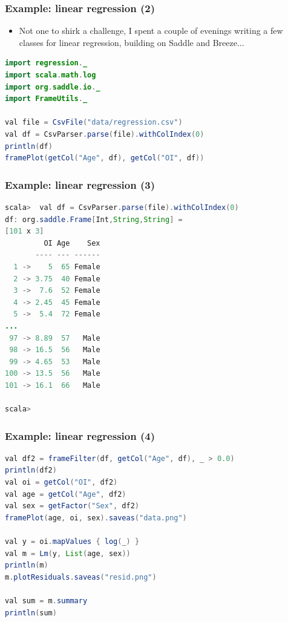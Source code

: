 \documentclass[mathserif,handout]{beamer}
\begin{document}
\begin{frame}[fragile]
\frametitle{Example: linear regression (2)}
\begin{itemize}
\item Not one to shirk a challenge, I spent a couple of evenings writing a few classes for linear regression, building on Saddle and Breeze...
\end{itemize}
{\small
\begin{lstlisting}[language=java]
import regression._
import scala.math.log
import org.saddle.io._
import FrameUtils._

val file = CsvFile("data/regression.csv")
val df = CsvParser.parse(file).withColIndex(0)
println(df)
framePlot(getCol("Age", df), getCol("OI", df))
\end{lstlisting}
}
\end{frame}

\begin{frame}[fragile]
\frametitle{Example: linear regression (3)}
{\scriptsize
\begin{lstlisting}[language=java]
scala>  val df = CsvParser.parse(file).withColIndex(0)
df: org.saddle.Frame[Int,String,String] =
[101 x 3]
         OI Age    Sex
       ---- --- ------
  1 ->    5  65 Female
  2 -> 3.75  40 Female
  3 ->  7.6  52 Female
  4 -> 2.45  45 Female
  5 ->  5.4  72 Female
...
 97 -> 8.89  57   Male
 98 -> 16.5  56   Male
 99 -> 4.65  53   Male
100 -> 13.5  56   Male
101 -> 16.1  66   Male

scala> 
\end{lstlisting}
}
\end{frame}

\begin{frame}[fragile]
\frametitle{Example: linear regression (4)}
{\scriptsize
\begin{lstlisting}[language=java]
val df2 = frameFilter(df, getCol("Age", df), _ > 0.0)
println(df2)
val oi = getCol("OI", df2)
val age = getCol("Age", df2)
val sex = getFactor("Sex", df2)
framePlot(age, oi, sex).saveas("data.png")

val y = oi.mapValues { log(_) }
val m = Lm(y, List(age, sex))
println(m)
m.plotResiduals.saveas("resid.png")

val sum = m.summary
println(sum)
\end{lstlisting}
}
\end{frame}

\end{document}
